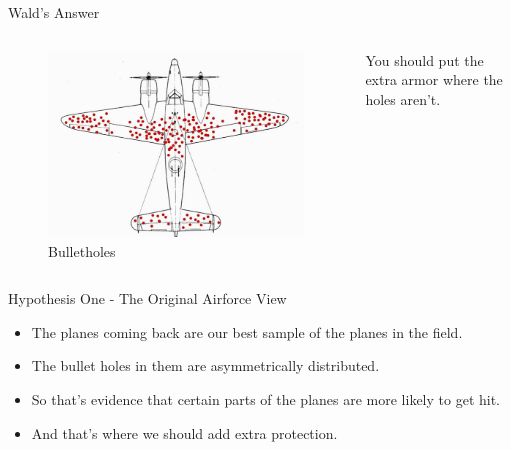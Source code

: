 \documentclass[
  ignorenonframetext,
]{beamer}
\providecommand{\tightlist}{%
  \setlength{\itemsep}{0pt}\setlength{\parskip}{0pt}}
\renewcommand{\,}{\text{, }}
\begin{document}
\begin{frame}{Wald's Answer}
\protect\hypertarget{walds-answer}{}
\begin{columns}[c]
\begin{column}{0.48\textwidth}
\begin{figure}
\centering
\includegraphics{../images/week10/wald_plane.jpg}
\caption{Bulletholes}
\end{figure}
\end{column}

\begin{column}{0.48\textwidth}
You should put the extra armor where the holes aren't.
\end{column}
\end{columns}
\end{frame}

\begin{frame}{Hypothesis One - The Original Airforce View}
\protect\hypertarget{hypothesis-one---the-original-airforce-view}{}
\begin{itemize}
\tightlist
\item
  The planes coming back are our best sample of the planes in the field.
\item
  The bullet holes in them are asymmetrically distributed.
\item
  So that's evidence that certain parts of the planes are more likely to
  get hit.
\item
  And that's where we should add extra protection.
\end{itemize}
\end{frame}
\end{document}
